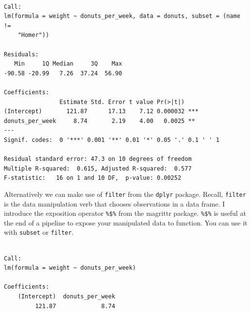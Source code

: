\documentclass[]{book}
\newenvironment{Shaded}{\begin{snugshade}}{\end{snugshade}}
\newcommand{\KeywordTok}[1]{\textcolor[rgb]{0.13,0.29,0.53}{\textbf{#1}}}
\newcommand{\NormalTok}[1]{#1}
\newcommand{\OperatorTok}[1]{\textcolor[rgb]{0.81,0.36,0.00}{\textbf{#1}}}
\newcommand{\StringTok}[1]{\textcolor[rgb]{0.31,0.60,0.02}{#1}}
\begin{document}
\begin{Shaded}
\end{Shaded}

\begin{verbatim}

Call:
lm(formula = weight ~ donuts_per_week, data = donuts, subset = (name != 
    "Homer"))

Residuals:
   Min     1Q Median     3Q    Max 
-90.58 -20.99   7.26  37.24  56.90 

Coefficients:
                Estimate Std. Error t value Pr(>|t|)    
(Intercept)       121.87      17.13    7.12 0.000032 ***
donuts_per_week     8.74       2.19    4.00   0.0025 ** 
---
Signif. codes:  0 '***' 0.001 '**' 0.01 '*' 0.05 '.' 0.1 ' ' 1

Residual standard error: 47.3 on 10 degrees of freedom
Multiple R-squared:  0.615, Adjusted R-squared:  0.577 
F-statistic:   16 on 1 and 10 DF,  p-value: 0.00252
\end{verbatim}

Alternatively we can make use of \texttt{filter} from the \texttt{dplyr} package. Recall, \texttt{filter} is the data manipulation verb that chooses observations in a data frame. I introduce the exposition operator \texttt{\%\$\%} from the magrittr package. \texttt{\%\$\%} is useful at the end of a pipeline to expose your manipulated data to function. You can use it with \texttt{subset} or \texttt{filter}.

\begin{Shaded}
\end{Shaded}

\begin{verbatim}

Call:
lm(formula = weight ~ donuts_per_week)

Coefficients:
    (Intercept)  donuts_per_week  
         121.87             8.74  
\end{verbatim}
\end{document}
